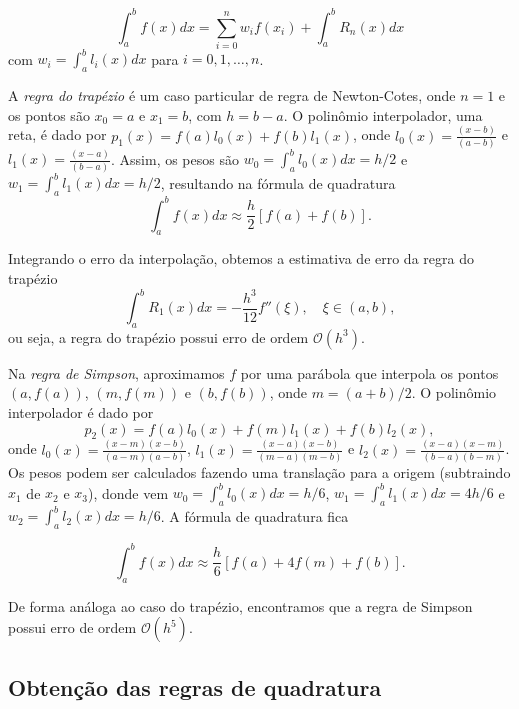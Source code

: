 \documentclass{article}
\begin{document}
\begin{equation}
    \int_{a}^{b} f(x) dx = \sum_{i=0}^{n} w_i f(x_i) + \int_{a}^{b} R_n(x) dx
\end{equation}
com \(w_i = \int_{a}^{b} l_i(x) dx\) para \(i = 0, 1, \ldots, n\).

A \emph{regra do trapézio} é um caso particular de regra de Newton-Cotes, onde \(n = 1\) e os pontos são \(x_0 = a\) e \(x_1 = b\), com \(h = b-a\). O polinômio interpolador, uma reta, é dado por \(p_1(x) = f(a)l_0(x) + f(b)l_1(x)\), onde \(l_0(x) = \frac{(x-b)}{(a-b)}\) e \(l_1(x) = \frac{(x-a)}{(b-a)}\). Assim, os pesos são \(w_0 = \int_{a}^{b} l_0(x) dx = h/2\) e \(w_1 = \int_{a}^{b} l_1(x) dx = h/2\), resultando na fórmula de quadratura
\begin{equation}
    \int_{a}^{b} f(x) dx \approx \frac{h}{2} [f(a) + f(b)].
\end{equation}

Integrando o erro da interpolação, obtemos a estimativa de erro da regra do trapézio
\begin{equation}
    \int_{a}^{b} R_1(x) dx = -\frac{h^3}{12} f''(\xi), \quad \xi \in (a, b),
\end{equation}
ou seja, a regra do trapézio possui erro de ordem \(\mathcal{O}(h^3)\).

Na \emph{regra de Simpson}, aproximamos \(f\) por uma parábola que interpola os pontos \((a, f(a))\), \((m, f(m))\) e \((b, f(b))\), onde \(m = (a+b)/2\). O polinômio interpolador é dado por
\begin{equation}
    p_2(x) = f(a)l_0(x) + f(m)l_1(x) + f(b)l_2(x),
\end{equation}
onde \(l_0(x) = \frac{(x-m)(x-b)}{(a-m)(a-b)}\), \(l_1(x) = \frac{(x-a)(x-b)}{(m-a)(m-b)}\) e \(l_2(x) = \frac{(x-a)(x-m)}{(b-a)(b-m)}\). Os pesos podem ser calculados fazendo uma translação para a origem (subtraindo \(x_1\) de \(x_2\) e \(x_3\)), donde vem \(w_0 = \int_{a}^{b} l_0(x) dx = h/6\), \(w_1 = \int_{a}^{b} l_1(x) dx = 4h/6\) e \(w_2 = \int_{a}^{b} l_2(x) dx = h/6\). A fórmula de quadratura fica

\begin{equation}
    \int_{a}^{b} f(x) dx \approx \frac{h}{6} [f(a) + 4f(m) + f(b)].
\end{equation}

De forma análoga ao caso do trapézio, encontramos que a regra de Simpson possui erro de ordem \(\mathcal{O}(h^5)\).

\subsection{Obtenção das regras de quadratura}
\end{document}
